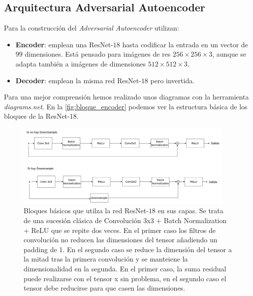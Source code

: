         \subsection{Arquitectura Adversarial Autoencoder}
            \noindent Para la construcción del \textit{Adversarial Autoencoder} utilizan:
            
            \begin{itemize}
                \item \textbf{Encoder}: emplean una ResNet-$18$  hasta codificar la entrada en un vector de $99$ dimensiones. Está pensado para imágenes de res $256 \times 256 \times 3$, aunque se adapta también a imágenes de dimensiones $512 \times 512 \times 3$.
                \item \textbf{Decoder}: emplean la misma red ResNet-$18$ pero invertida.
            \end{itemize}

            \noindent Para una mejor comprensión hemos realizado unos diagramas con la herramienta \textit{diagrams.net}. En la \autoref{fig:bloque_encoder} podemos ver la estructura básica de los bloques de la ResNet-$18$.

            \begin{figure}[!h]
                \centering
                \includegraphics[width=0.95\textwidth]{img/bloque_basico_encoder.png}
                \caption{Bloques básicos que utilza la red ResNet-$18$ en sus capas. Se trata de una sucesión clásica de Convolución 3x3 + Batch Normalization + ReLU que se repite dos veces. En el primer caso los filtros de convolución no reducen las dimensiones del tensor añadiendo un padding de 1. En el segundo caso se reduce la dimensión del tensor a la mitad tras la primera convolución y se manteiene la dimensionalidad en la segunda. En el primer caso, la suma residual puede realizarse con el tensor x sin problema, en el segundo caso el tensor debe reducirse para que casen las dimensiones.}
                \label{fig:bloque_encoder}
            \end{figure}

